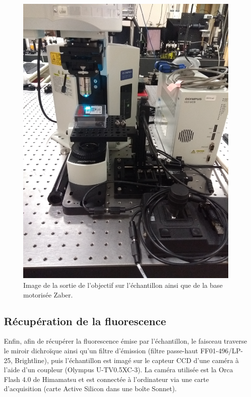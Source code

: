\documentclass{article}       %
\begin{document}
\begin{figure}[H]
    \centering
    \includegraphics[scale=0.07]{fig/Zaber.jpg}
    \caption{Image de la sortie de l'objectif sur l'échantillon ainsi que de la base motorisée Zaber.}
    \label{Fig:Zaber}
\end{figure}

\subsection{Récupération de la fluorescence}

Enfin, afin de récupérer la fluorescence émise par l'échantillon, le faisceau traverse le miroir dichroïque ainsi qu'un filtre d'émission (filtre passe-haut FF01-496/LP-25, Brightline), puis l'échantillon est imagé sur le capteur CCD d'une caméra à l'aide d'un coupleur (Olympus U-TV0.5XC-3). La caméra utilisée est la Orca Flash 4.0 de Himamatsu et est connectée à l'ordinateur via une carte d'acquisition (carte Active Silicon dans une boîte Sonnet).
\end{document}
